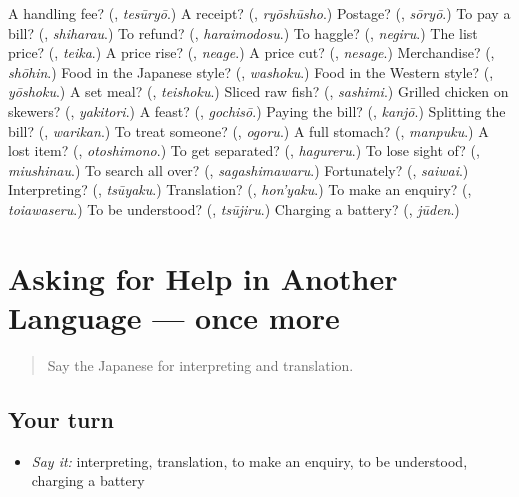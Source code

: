 \begin{tcolorbox}[breakable,colback=teal!4,colframe=teal!35!black,title={Before you move on}]
A handling fee? (\textbf{}, \emph{tesūryō}.) A receipt? (\textbf{}, \emph{ryōshūsho}.) Postage? (\textbf{}, \emph{sōryō}.) To pay a bill? (\textbf{}, \emph{shiharau}.) To refund? (\textbf{}, \emph{haraimodosu}.) To haggle? (\textbf{}, \emph{negiru}.) The list price? (\textbf{}, \emph{teika}.) A price rise? (\textbf{}, \emph{neage}.) A price cut? (\textbf{}, \emph{nesage}.) Merchandise? (\textbf{}, \emph{shōhin}.) Food in the Japanese style? (\textbf{}, \emph{washoku}.) Food in the Western style? (\textbf{}, \emph{yōshoku}.) A set meal? (\textbf{}, \emph{teishoku}.) Sliced raw fish? (\textbf{}, \emph{sashimi}.) Grilled chicken on skewers? (\textbf{}, \emph{yakitori}.) A feast? (\textbf{}, \emph{gochisō}.) Paying the bill? (\textbf{}, \emph{kanjō}.) Splitting the bill? (\textbf{}, \emph{warikan}.) To treat someone? (\textbf{}, \emph{ogoru}.) A full stomach? (\textbf{}, \emph{manpuku}.) A lost item? (\textbf{}, \emph{otoshimono}.) To get separated? (\textbf{}, \emph{hagureru}.) To lose sight of? (\textbf{}, \emph{miushinau}.) To search all over? (\textbf{}, \emph{sagashimawaru}.) Fortunately? (\textbf{}, \emph{saiwai}.) Interpreting? (\textbf{}, \emph{tsūyaku}.) Translation? (\textbf{}, \emph{hon'yaku}.) To make an enquiry? (\textbf{}, \emph{toiawaseru}.) To be understood? (\textbf{}, \emph{tsūjiru}.) Charging a battery? (\textbf{}, \emph{jūden}.)
\end{tcolorbox}
\section[(dialogue)]{Asking for Help in Another Language — once more}

\label{lesson:JA-R425-review-final-425}



\begin{quote}
Say the Japanese for interpreting and translation.
\end{quote}

\subsection*{Your turn}
\begin{itemize}
\raggedright
  \item \emph{Say it:} interpreting, translation, to make an enquiry, to be understood, charging a battery
\end{itemize}

